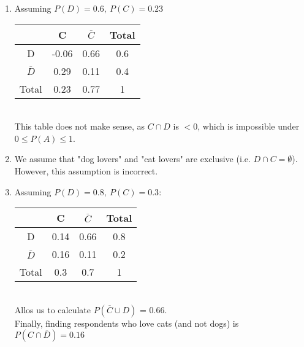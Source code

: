 \documentclass{article}
\begin{document}
\begin{enumerate}[label=\alph*)]
    \item Assuming \(P(D) = 0.6,\ P(C) = 0.23\) \\
    \begin{tabular}{|c|c|c|c|}
        \hline
        & C & \(\overline{C}\) & Total \\
        \hline
        D & -0.06 & 0.66 & 0.6 \\
        \hline
        \(\overline{D}\) & 0.29 & 0.11 & 0.4 \\
        \hline
        Total & 0.23 & 0.77 & 1 \\
        \hline
    \end{tabular} \\
    This table does not make sense, as \(C \cap D\) is \(< 0\), which is impossible under \(0 \le P(A) \le 1\).
    \item We assume that "dog lovers" and "cat lovers" are exclusive (i.e. \(D \cap C = \emptyset\)). \\
    However, this assumption is incorrect.
    \item  Assuming \(P(D) = 0.8,\ P(C) = 0.3\):\\
    \begin{tabular}{|c|c|c|c|}
        \hline
        & C & \(\overline{C}\) & Total \\
        \hline
        D & 0.14 & 0.66 & 0.8 \\
        \hline
        \(\overline{D}\) & 0.16 & 0.11 & 0.2 \\
        \hline
        Total & 0.3 & 0.7 & 1 \\
        \hline
    \end{tabular} \\
    Allos us to calculate \(P(\overline{C} \cup D)\) = 0.66. \\
    Finally, finding respondents who love cats (and not dogs) is \(P(C \cap \overline{D}) = 0.16\)
\end{enumerate}

\pagebreak
\end{document}
